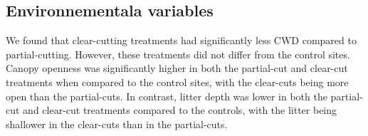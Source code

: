 


\subsection*{Environnementala variables}
\label{disc:env_var}

We found that clear-cutting treatments had significantly less CWD compared to partial-cutting. However, these treatments did not differ from the control sites. 
Canopy openness was significantly higher in both the partial-cut and clear-cut treatments when compared to the control sites, with the clear-cuts being more open than the partial-cuts. 
In contrast, litter depth was lower in both the partial-cut and clear-cut treatments compared to the controls, with the litter being shallower in the clear-cuts than in the partial-cuts.

